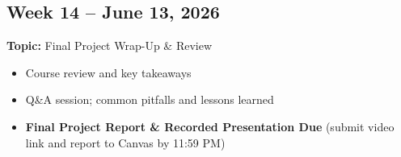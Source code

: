 \documentclass[
  10pt,
]{article}
\providecommand{\tightlist}{%
  \setlength{\itemsep}{0pt}\setlength{\parskip}{0pt}}
\newenvironment{blackbox}{%
  \def\FrameCommand{%
    \hspace{1pt}%
    {\color{boxborder}\vrule width 2pt}%
    {\color{boxbg}\vrule width 4pt}%
    \colorbox{boxbg}%
  }%
  \MakeFramed{\advance\hsize-\width\FrameRestore}%
  \noindent\ignorespaces
}{%
  \endMakeFramed
}
\begin{document}
\begin{blackbox}

\begin{center}

\subsection{Week 14 -- June 13, 2026}\label{week-14-june-13-2026}

\end{center}

\textbf{Topic:} Final Project Wrap-Up \& Review

\begin{itemize}
\tightlist
\item
  Course review and key takeaways
\item
  Q\&A session; common pitfalls and lessons learned
\item
  \textbf{Final Project Report \& Recorded Presentation Due} (submit
  video link and report to Canvas by 11:59 PM)
\end{itemize}

\end{blackbox}
\end{document}
